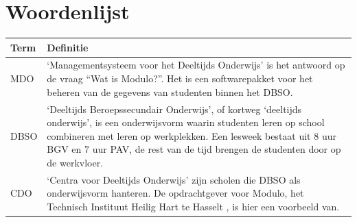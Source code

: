 \documentclass[a4paper]{article}
\begin{document}
\section{Woordenlijst}  \label{sec:word_list} %
\def\arraystretch{1.8}
\begin{tabularx}{\textwidth}{l | X}
    Term & Definitie \\
    \hline \hline
    MDO &`Managementsysteem voor het Deeltijds Onderwijs' is het antwoord op de vraag ``Wat is Modulo?''. Het is een softwarepakket voor het beheren van de gegevens van studenten binnen het DBSO. \\
    \hline
    DBSO & `Deeltijds Beroepssecundair Onderwijs', of kortweg `deeltijds onderwijs', is een onderwijsvorm waarin studenten leren op school combineren met leren op werkplekken. Een lesweek bestaat uit 8 uur BGV en 7 uur PAV, de rest van de tijd brengen de studenten door op de werkvloer. \cite{DBSO} \\
    \hline
    CDO & `Centra voor Deeltijds Onderwijs' zijn scholen die DBSO als onderwijsvorm hanteren. De opdrachtgever voor Modulo, het Technisch Instituut Heilig Hart te Hasselt \cite{TIHH}, is hier een voorbeeld van. \cite{CDO} \\
\end{tabularx}
\end{document}
